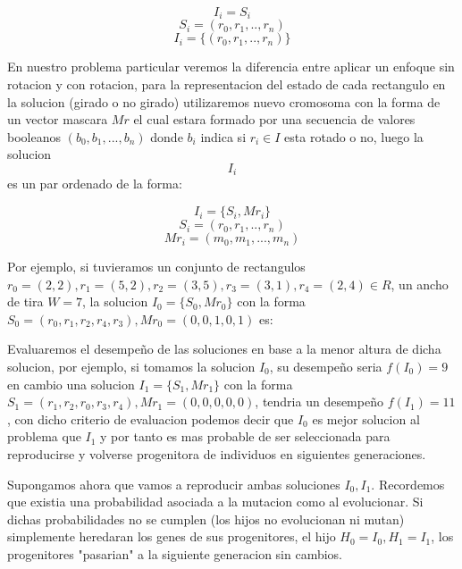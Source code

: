 \documentclass[10pt]{article}
\begin{document}
$$I_i = S_i$$
$$S_i = (r_0,r_1,..,r_n)$$
$$I_i = \{(r_0,r_1,..,r_n)\}$$

En nuestro problema particular veremos la diferencia entre aplicar un enfoque sin rotacion y con rotacion, para la representacion del estado de cada rectangulo en la solucion (girado o no girado) utilizaremos nuevo cromosoma con la forma de un vector mascara $Mr$ el cual estara formado por una secuencia de valores booleanos $(b_0, b_1,...,b_n)$ donde $b_i$ indica si $r_i \in I$ esta rotado o no, luego la solucion $$I_i$$ es un par ordenado de la forma:

$$I_i = \{S_i,Mr_i\}$$
$$S_i = (r_0,r_1,..,r_n)$$
$$Mr_i = (m_0, m_1,...,m_n)$$


Por ejemplo, si tuvieramos un conjunto de rectangulos $r_0=(2,2),r_1=(5,2),r_2=(3,5), r_3 = (3,1), r_4=(2,4)\in R$, un ancho de tira $W = 7$, la solucion $I_0 = \{S_0,Mr_0\}$ con la forma $S_0 = (r_0,r_1,r_2,r_4,r_3), Mr_0 = (0,0,1,0,1)$ es:


Evaluaremos el desempeño de las soluciones en base a la menor altura de dicha solucion, por ejemplo, si tomamos la solucion $I_0$, su desempeño seria $f(I_0) = 9$ en cambio una solucion $I_1 = \{S_1,Mr_1\}$ con la forma $S_1 = (r_1,r_2,r_0,r_3,r_4), Mr_1 = (0,0,0,0,0)$, tendria un desempeño $f(I_1) = 11$, con dicho criterio de evaluacion podemos decir que $I_0$ es mejor solucion al problema que $I_1$ y por tanto es mas probable de ser seleccionada para reproducirse y volverse progenitora de individuos en siguientes generaciones.


Supongamos ahora que vamos a reproducir ambas soluciones $I_0,I_1$. Recordemos que existia una probabilidad asociada a la mutacion como al evolucionar. Si dichas probabilidades no se cumplen (los hijos no evolucionan ni mutan) simplemente heredaran los genes de sus progenitores, el hijo $H_0 = I_0, H_1 = I_1$, los progenitores "pasarian" a la siguiente generacion sin cambios.
\end{document}
